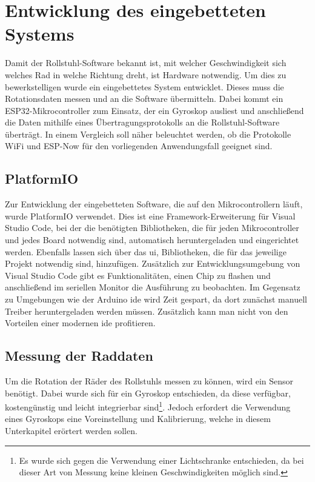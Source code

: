 \chapter{Entwicklung des eingebetteten Systems}
Damit der Rollstuhl-Software bekannt ist, mit welcher Geschwindigkeit sich welches Rad in welche Richtung dreht, ist Hardware notwendig.
Um dies zu bewerkstelligen wurde ein eingebettetes System entwicklet. Dieses muss die Rotationsdaten messen und an die Software übermitteln.
Dabei kommt ein ESP32-Mikrocontroller zum Einsatz, der ein Gyroskop ausliest und anschließend die Daten mithilfe eines Übertragungsprotokolls an die Rollstuhl-Software überträgt.
In einem Vergleich soll näher beleuchtet werden, ob die Protokolle WiFi und ESP-Now für den vorliegenden Anwendungsfall geeignet sind.

\section{PlatformIO}
Zur Entwicklung der eingebetteten Software, die auf den Mikrocontrollern läuft, wurde PlatformIO verwendet.
Dies ist eine Framework-Erweiterung für Visual Studio Code, bei der die benötigten Bibliotheken, die für jeden Mikrocontroller und jedes Board notwendig sind, automatisch heruntergeladen und eingerichtet werden\cite{WhatPlatformIOPlatformIO}.
Ebenfalls lassen sich über das \ac{ui}, Bibliotheken, die für das jeweilige Projekt notwendig sind, hinzufügen.
Zusätzlich zur Entwicklungsumgebung von Visual Studio Code gibt es Funktionalitäten, einen Chip zu flashen und anschließend im seriellen Monitor die Ausführung zu beobachten.
Im Gegensatz zu Umgebungen wie der Arduino \ac{ide} wird Zeit gespart, da dort zunächst manuell Treiber heruntergeladen werden müssen.
Zusätzlich kann man nicht von den Vorteilen einer modernen \ac{ide} profitieren.

\section{Messung der Raddaten}
Um die Rotation der Räder des Rollstuhls messen zu können, wird ein Sensor benötigt.
Dabei wurde sich für ein Gyroskop entschieden, da diese verfügbar, kostengünstig und leicht integrierbar sind\footnote{Es wurde sich gegen die Verwendung einer Lichtschranke entschieden, da bei dieser Art von Messung keine kleinen Geschwindigkeiten möglich sind.}.
Jedoch erfordert die Verwendung eines Gyroskops eine Voreinstellung und Kalibrierung, welche in diesem Unterkapitel erörtert werden sollen.

